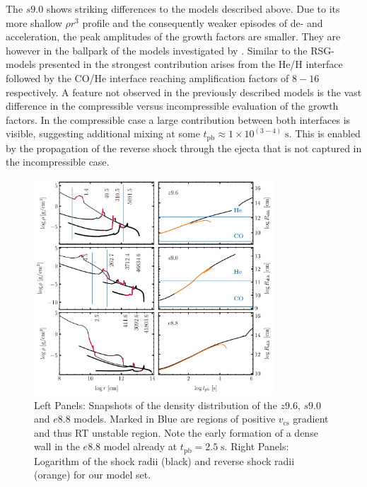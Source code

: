 \documentclass[fleqn,usenatbib]{mnras}
\begin{document}
The $s9.0$ shows striking differences to the models described above. 
Due to its more shallow $\rho r^3$ profile and the consequently weaker episodes of de- and acceleration, the peak amplitudes of the growth factors are smaller. They are however in the ballpark of the models investigated by \citep{Wongwathanarat2015}. 
Similar to the RSG-models presented in \citet{Wongwathanarat2015} the strongest contribution arises from the He/H interface followed by the CO/He interface reaching amplification factors of $8-16$ respectively. 
A feature not observed in the previously described models is the vast difference in the compressible versus incompressible evaluation of the growth factors. In the compressible case a large contribution between both interfaces is visible, suggesting additional mixing at some $t_{\mathrm{pb}}\approx 1\times 10^{(3-4)}\;\mathrm{s}$. This is enabled by the propagation of the reverse shock through the ejecta that is not captured in the incompressible case. 

\begin{figure}
 \centering
 \includegraphics[width=0.8\textwidth]{pic/density_times_all.pdf}
 \caption{Left Panels: Snapshots of the density distribution of the $z9.6$, $s9.0$ and $e8.8$ models. Marked in Blue are regions of positive $v_{\mathrm{cs}}$ gradient and thus RT unstable region. Note the early formation of a dense wall in the $e8.8$ model already at $t_{\mathrm{pb}}=2.5\;\mathrm{s}$. Right Panels: Logarithm of the shock radii (black) and reverse shock radii (orange) for our model set. }
 \label{fig:density all times}
\end{figure}
\end{document}
